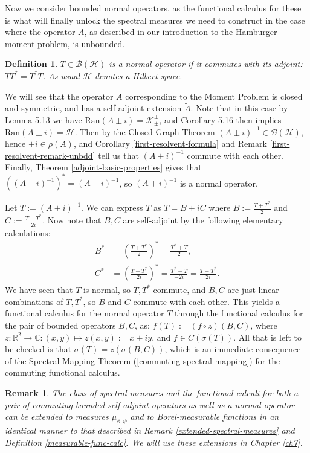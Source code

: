 \documentclass[12pt,oneside]{report}
\newtheorem{defn}[thm]{Definition}
\newtheorem{rem}[thm]{Remark}
\begin{document}
Now we consider bounded normal operators, as the functional calculus for these is what will finally unlock the spectral measures we need to construct in the case where the operator $A$, as described in our introduction to the Hamburger moment problem, is unbounded.

\begin{defn}
    $T \in \mathscr{B}(\mathscr{H})$ is a normal operator if it commutes with its adjoint: $TT^*=T^*T$. As usual $\mathscr{H}$ denotes a Hilbert space.
\end{defn}

We will see that the operator $A$ corresponding to the Moment Problem is closed and symmetric, and has a self-adjoint extension $\tilde{A}$. Note that in this case by Lemma 5.13 we have $\mathrm{Ran}(A \pm i) = \mathscr{K}_{\pm}^{\perp}$, and Corollary 5.16 then implies $\mathrm{Ran}(A\pm i) = \mathscr{H}$. Then by the Closed Graph Theorem $(A \pm i)^{-1} \in \mathscr{B}(\mathscr{H})$, hence $\pm i \in \rho(A)$, and Corollary \ref{first-resolvent-formula} and Remark \ref{first-resolvent-remark-unbdd} tell us that $(A \pm i)^{-1}$ commute with each other. Finally, Theorem \ref{adjoint-basic-properties} gives that $((A + i)^{-1})^{*} = (A - i)^{-1}$, so $(A + i)^{-1}$ is a normal operator.

Let $T := (A + i)^{-1}$. We can express $T$ as $T = B + iC$ where $B := \frac{T + T^{*}}{2}$ and $C := \frac{T - T^{*}}{2i}$. Now note that $B,C$ are self-adjoint by the following elementary calculations:
\begin{align*}
B^{*} &= \left( \frac{T+T^{*}}{2} \right)^{*} = \frac{T^{*} + T}{2}, \\
C^{*} &= \left( \frac{T - T^{*}}{2i} \right)^{*} = \frac{T^{*} - T}{-2i} = \frac{T - T^{*}}{2i}.
\end{align*}
We have seen that $T$ is normal, so $T,T^{*}$ commute, and $B,C$ are just linear combinations of $T,T^{*}$, so $B$ and $C$ commute with each other. This yields a functional calculus for the normal operator $T$ through the functional calculus for the pair of bounded operators $B,C$, as: $f(T) := (f \circ z)(B,C)$, where $z: \mathbb{R}^{2} \to \mathbb{C}: (x,y) \mapsto z(x,y) := x + iy$, and $f \in C(\sigma(T))$. All that is left to be checked is that $\sigma(T) = z(\sigma(B,C))$, which is an immediate consequence of the Spectral Mapping Theorem (\ref{commuting-spectral-mapping}) for the commuting functional calculus.

\begin{rem}
    The class of spectral measures and the functional calculi for both a pair of commuting bounded self-adjoint operators as well as a normal operator can be extended to measures $\mu_{\phi,\psi}$ and to Borel-measurable functions in an identical manner to that described in Remark \ref{extended-spectral-measures} and Definition \ref{measurable-func-calc}. We will use these extensions in Chapter \ref{ch7}.
\end{rem}
\end{document}
